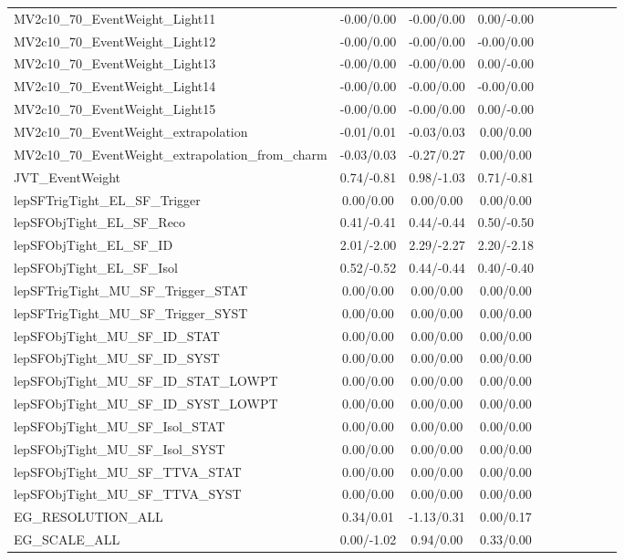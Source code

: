 \begin{table}[h]
\begin{center}
\begin{tabular}{l|ccccccccc}
MV2c10\_70\_EventWeight\_Light11 &-0.00/0.00 &-0.00/0.00 &0.00/-0.00 \\
MV2c10\_70\_EventWeight\_Light12 &-0.00/0.00 &-0.00/0.00 &-0.00/0.00 \\
MV2c10\_70\_EventWeight\_Light13 &-0.00/0.00 &-0.00/0.00 &0.00/-0.00 \\
MV2c10\_70\_EventWeight\_Light14 &-0.00/0.00 &-0.00/0.00 &-0.00/0.00 \\
MV2c10\_70\_EventWeight\_Light15 &-0.00/0.00 &-0.00/0.00 &0.00/-0.00 \\
MV2c10\_70\_EventWeight\_extrapolation &-0.01/0.01 &-0.03/0.03 &0.00/0.00 \\
MV2c10\_70\_EventWeight\_extrapolation\_from\_charm &-0.03/0.03 &-0.27/0.27 &0.00/0.00 \\
JVT\_EventWeight &0.74/-0.81 &0.98/-1.03 &0.71/-0.81 \\
lepSFTrigTight\_EL\_SF\_Trigger &0.00/0.00 &0.00/0.00 &0.00/0.00 \\
lepSFObjTight\_EL\_SF\_Reco &0.41/-0.41 &0.44/-0.44 &0.50/-0.50 \\
lepSFObjTight\_EL\_SF\_ID &2.01/-2.00 &2.29/-2.27 &2.20/-2.18 \\
lepSFObjTight\_EL\_SF\_Isol &0.52/-0.52 &0.44/-0.44 &0.40/-0.40 \\
lepSFTrigTight\_MU\_SF\_Trigger\_STAT &0.00/0.00 &0.00/0.00 &0.00/0.00 \\
lepSFTrigTight\_MU\_SF\_Trigger\_SYST &0.00/0.00 &0.00/0.00 &0.00/0.00 \\
lepSFObjTight\_MU\_SF\_ID\_STAT &0.00/0.00 &0.00/0.00 &0.00/0.00 \\
lepSFObjTight\_MU\_SF\_ID\_SYST &0.00/0.00 &0.00/0.00 &0.00/0.00 \\
lepSFObjTight\_MU\_SF\_ID\_STAT\_LOWPT &0.00/0.00 &0.00/0.00 &0.00/0.00 \\
lepSFObjTight\_MU\_SF\_ID\_SYST\_LOWPT &0.00/0.00 &0.00/0.00 &0.00/0.00 \\
lepSFObjTight\_MU\_SF\_Isol\_STAT &0.00/0.00 &0.00/0.00 &0.00/0.00 \\
lepSFObjTight\_MU\_SF\_Isol\_SYST &0.00/0.00 &0.00/0.00 &0.00/0.00 \\
lepSFObjTight\_MU\_SF\_TTVA\_STAT &0.00/0.00 &0.00/0.00 &0.00/0.00 \\
lepSFObjTight\_MU\_SF\_TTVA\_SYST &0.00/0.00 &0.00/0.00 &0.00/0.00 \\
EG\_RESOLUTION\_ALL &0.34/0.01 &-1.13/0.31 &0.00/0.17 \\
EG\_SCALE\_ALL &0.00/-1.02 &0.94/0.00 &0.33/0.00 \\

\end{tabular}
\end{center}
\end{table}
